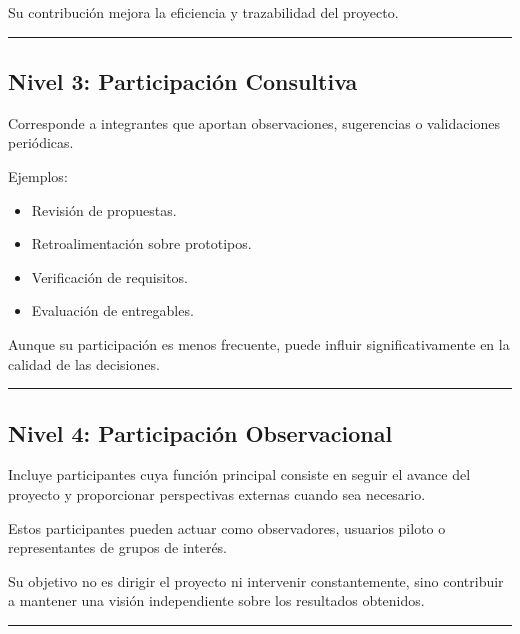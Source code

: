 \documentclass[14pt,a4paper,oneside]{extbook}
\begin{document}
Su contribución mejora la eficiencia y trazabilidad del proyecto.

\par\vspace{1.5em}\noindent\hfill\rule{0.25\textwidth}{0.6pt}\hfill\par\vspace{1.5em}

\subsection{Nivel 3: Participación Consultiva}

Corresponde a integrantes que aportan observaciones, sugerencias o validaciones periódicas.

Ejemplos:

\begin{itemize}
\item Revisión de propuestas.
\item Retroalimentación sobre prototipos.
\item Verificación de requisitos.
\item Evaluación de entregables.
\end{itemize}

Aunque su participación es menos frecuente, puede influir significativamente en la calidad de las decisiones.

\par\vspace{1.5em}\noindent\hfill\rule{0.25\textwidth}{0.6pt}\hfill\par\vspace{1.5em}

\subsection{Nivel 4: Participación Observacional}

Incluye participantes cuya función principal consiste en seguir el avance del proyecto y proporcionar perspectivas externas cuando sea necesario.

Estos participantes pueden actuar como observadores, usuarios piloto o representantes de grupos de interés.

Su objetivo no es dirigir el proyecto ni intervenir constantemente, sino contribuir a mantener una visión independiente sobre los resultados obtenidos.

\par\vspace{1.5em}\noindent\hfill\rule{0.25\textwidth}{0.6pt}\hfill\par\vspace{1.5em}
\end{document}
